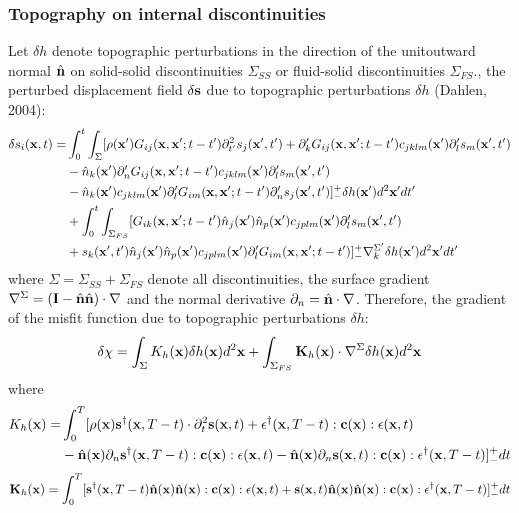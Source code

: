 \subsubsection{Topography on internal discontinuities}
Let $\delta h$ denote topographic perturbations in the direction of the unitoutward normal $\hat{\mathbf{n}}$ on solid-solid discontinuities $\Sigma_{SS}$ or fluid-solid discontinuities $\Sigma_{FS}$., the perturbed displacement field $\delta\mathbf{s}$ due to topographic perturbations $\delta h$ (Dahlen, 2004):
\begin{align*}
  \delta s_i(\mathbf{x},t)= & \int_0^t\int_\Sigma[\rho(\mathbf{x}')G_{ij}(\mathbf{x},\mathbf{x}';t-t')\partial_{t'}^2s_j(\mathbf{x}',t')+\partial_k^\prime G_{ij}(\mathbf{x},\mathbf{x}';t-t')c_{jklm}(\mathbf{x}')\partial_l^\prime s_m(\mathbf{x}',t') \\
    & -\hat{n}_k(\mathbf{x}')\partial_n^\prime G_{ij}(\mathbf{x},\mathbf{x}';t-t')c_{jklm}(\mathbf{x}')\partial_l^\prime s_m(\mathbf{x}',t') \\
	& -\hat{n}_k(\mathbf{x}')c_{jklm}(\mathbf{x}')\partial_l^\prime G_{im}(\mathbf{x},\mathbf{x}';t-t')\partial_n^\prime s_j(\mathbf{x}',t')]_-^+\delta h(\mathbf{x}')d^2\mathbf{x}'dt' \\
	& +\int_0^t\int_{\Sigma_{FS}}[G_{ik}(\mathbf{x},\mathbf{x}';t-t')\hat{n}_j(\mathbf{x}')\hat{n}_p(\mathbf{x}')c_{jplm}(\mathbf{x}')\partial_l^\prime s_m(\mathbf{x}',t') \\
	& +s_k(\mathbf{x}',t')\hat{n}_j(\mathbf{x}')\hat{n}_p(\mathbf{x}')c_{jplm}(\mathbf{x}')\partial_l^\prime G_{im}(\mathbf{x},\mathbf{x}';t-t')]_-^+\nabla_k^{\Sigma^\prime}\delta h(\mathbf{x}')d^2\mathbf{x}'dt'
\end{align*}
where $\Sigma=\Sigma_{SS}+\Sigma_{FS}$ denote all discontinuities, the surface gradient $\nabla^\Sigma=(\mathbf{I}-\hat{\mathbf{n}}\hat{\mathbf{n}})\cdot\nabla$ and the normal derivative $\partial_n=\hat{\mathbf{n}}\cdot\nabla$. Therefore, the gradient of the misfit function due to topographic perturbations $\delta h$:
\[ \delta\chi=\int_\Sigma K_h(\mathbf{x})\delta h(\mathbf{x})d^2\mathbf{x}+\int_{\Sigma_{FS}}\mathbf{K}_h(\mathbf{x})\cdot\nabla^\Sigma\delta h(\mathbf{x})d^2\mathbf{x} \]
where
\begin{align*}
  K_h(\mathbf{x})= & \int_0^T[\rho(\mathbf{x})\mathbf{s}^\dagger(\mathbf{x},T-t)\cdot\partial_t^2\mathbf{s}(\mathbf{x},t)+\mathbf{\epsilon}^\dagger(\mathbf{x},T-t):\mathbf{c}(\mathbf{x}):\mathbf{\epsilon}(\mathbf{x},t) \\
    & -\hat{\mathbf{n}}(\mathbf{x})\partial_n\mathbf{s}^\dagger(\mathbf{x},T-t):\mathbf{c}(\mathbf{x}):\mathbf{\epsilon}(\mathbf{x},t)-\hat{\mathbf{n}}(\mathbf{x})\partial_n\mathbf{s}(\mathbf{x},t):\mathbf{c}(\mathbf{x}):\mathbf{\epsilon}^\dagger(\mathbf{x},T-t)]_-^+dt
\end{align*}
\[ \mathbf{K}_h(\mathbf{x})=\int_0^T[\mathbf{s}^\dagger(\mathbf{x},T-t)\hat{\mathbf{n}}(\mathbf{x})\hat{\mathbf{n}}(\mathbf{x}):\mathbf{c}(\mathbf{x}):\mathbf{\epsilon}(\mathbf{x},t)+\mathbf{s}(\mathbf{x},t)\hat{\mathbf{n}}(\mathbf{x})\hat{\mathbf{n}}(\mathbf{x}):\mathbf{c}(\mathbf{x}):\mathbf{\epsilon}^\dagger(\mathbf{x},T-t)]_-^+dt \]

